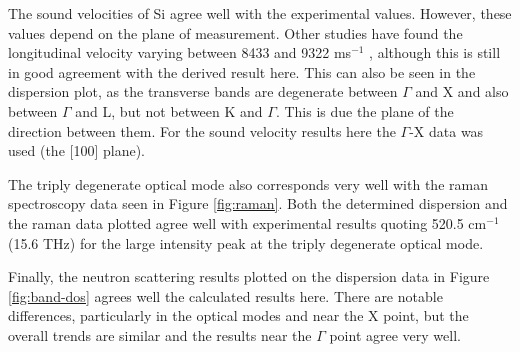 \documentclass[12pt]{article}
\begin{document}
\bigskip

\noindent The sound velocities of Si agree well with the experimental values. However, these values depend on the plane of measurement. Other studies have found the longitudinal velocity varying between 8433 and 9322 ms$^{-1}$ \cite{sicvary}, although this is still in good agreement with the derived result here. This can also be seen in the dispersion plot, as the transverse bands are degenerate between $\Gamma$ and X and also between $\Gamma$ and L, but not between K and $\Gamma$. This is due the plane of the direction between them. For the sound velocity results here the $\Gamma$-X data was used (the [100] plane).

The triply degenerate optical mode also corresponds very well with the raman spectroscopy data seen in Figure \ref{fig:raman}. Both the determined dispersion and the raman data plotted agree well with experimental results\cite{raman} quoting 520.5 cm$^{-1}$ (15.6 THz) for the large intensity peak at the triply degenerate optical mode. 

Finally, the neutron scattering results plotted on the dispersion data in Figure \ref{fig:band-dos} agrees well the calculated results here. There are notable differences, particularly in the optical modes and near the X point, but the overall trends are similar and the results near the $\Gamma$ point agree very well.

\printbibliography
\end{document}
